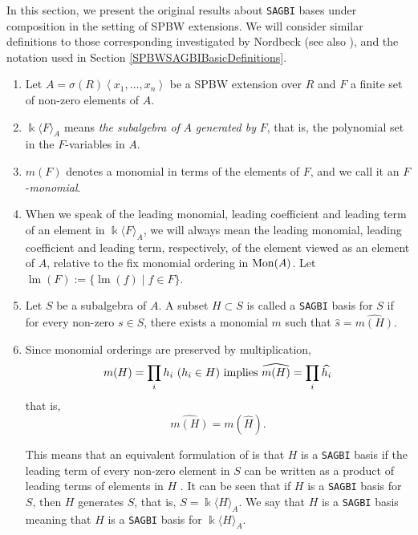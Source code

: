 \documentclass{amsart}
\theoremstyle{definition}
\theoremstyle{remark}
\numberwithin{equation}{section}
\begin{document}
In this section, we present the original results about \texttt{SAGBI} bases under composition in the setting of SPBW extensions. We will consider similar definitions to those corresponding investigated by Nordbeck \cite{NordbeckPhD2001} (see also \cite{Nordbeck2002}), and the notation used in Section  \ref{SPBWSAGBIBasicDefinitions}.
\begin{enumerate}
\item [\rm (1)] Let $A = \sigma(R)\left\langle x_{1}, \dotsc, x_{n}\right\rangle$ be a SPBW extension over $R$ and $F$ a finite set of non-zero elements of $A$.

\item [\rm (2)] $\Bbbk\langle F\rangle_{A}$ means {\em the subalgebra of} $A$ {\em generated by} $F$, that is, the polynomial set in the $F$-variables in $A$.

\item [\rm (3)] $m(F)$ denotes a monomial in terms of the elements of $F$, and we call it an $F$-{\em monomial}.

\item [\rm (4)] When we speak of the leading monomial, leading coefficient and leading term of an element in $\Bbbk\langle F\rangle_{A}$, we will always mean the leading monomial, leading coefficient and leading term, respectively, of the element viewed as an element of $A$, relative to the fix monomial ordering in ${\rm Mon}(A)$. Let $\operatorname{lm}(F):=\{\operatorname{lm}(f) \mid f \in F\}$. 

\item [\rm (5)] Let $S$ be a subalgebra of $A$. A subset $H\subset S$ is called a \texttt{SAGBI} basis for $S$ if for every non-zero $s\in S$, there exists a monomial $m$ such that $\widehat{s} = \widehat{m(H)}$.

\item [\rm (6)] Since monomial orderings are preserved by multiplication, \label{(6)}
\[
m(H) = \prod\limits_i h_i\ (h_i \in H)\ {\rm implies}\ \widehat{m(H)} = \prod\limits_i \widehat{h_i}
\]
that is,
\begin{equation}\label{Nordbeck2002(1)Analogue}
\widehat{m(H)} = m(\widehat{H}).    
\end{equation}

This means that an equivalent formulation of \cite[Definition 1]{Nordbeck2002} is that $H$ is a \texttt{SAGBI} basis if the leading term of every non-zero element in $S$ can be written as a product of leading terms of elements in $H$ \cite[Remark 1]{Nordbeck2002}. It can be seen that if $H$ is a \texttt{SAGBI} basis for $S$, then $H$ generates $S$, that is, $S = \Bbbk\langle H\rangle_{A}$. We say that $H$ is a \texttt{SAGBI} basis meaning that $H$ is a \texttt{SAGBI} basis for $\Bbbk\langle H\rangle_{A}$.


\end{enumerate}
\end{document}
